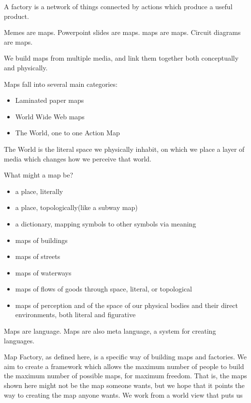 \documentclass[11pt]{article}
\begin{document}
A factory is a network of things connected by actions which produce a useful product.




Memes are maps.  Powerpoint slides are maps.  maps are maps.  Circuit diagrams are maps.  




We build maps from multiple media, and link them together both conceptually and physically.




Maps fall into several main categories:


\begin{itemize}

\item
Laminated paper maps
\item
World Wide Web maps
\item
The World, one to one Action Map
\end{itemize}


The World is the literal space we physically inhabit, on which we place a layer of media which changes how we perceive that world.  




What might a map be?


\begin{itemize}

\item
a place, literally
\item
a place, topologically(like a subway map)
\item
a dictionary, mapping symbols to other symbols via meaning
\item
maps of buildings
\item
maps of streets
\item
maps of waterways
\item
maps of flows of goods through space, literal, or topological
\item
maps of perception and of the space of our physical bodies and their direct environments, both literal and figurative
\end{itemize}


Maps are language.  Maps are also meta language, a system for creating languages.  




Map Factory, as defined here, is a specific way of building maps and factories.  We aim to create a framework which allows the maximum number of people to build the maximum number of possible maps, for maximum freedom.  That is, the maps shown here might not be the map someone wants, but we hope that it points the way to creating the map anyone wants.  We work from a world view that puts us 
\end{document}
